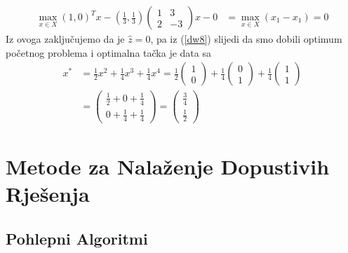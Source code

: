 \documentclass[a4paper, utf8, 11pt, colorlinks]{book}
\begin{document}
	 \begin{align*}
		\max_{x \in X} (1, 0)^T x - (\frac{1}{3}, \frac{1}{3})\left(\begin{array}{cc}
			1 & 3 \\
			2 & -3
		\end{array}\right)  x   - 0 &= \max_{x \in X} (x_1  - x_1 ) = 0    
	\end{align*} 
  Iz ovoga zaključujemo da je $\hat{z}=0$, pa iz (\ref{dw8}) slijedi da smo dobili optimum početnog problema i optimalna tačka je data sa 
\begin{align*}
  	 x^* &= \frac{1}{2} x^2 + \frac{1}{4} x^3 + \frac{1}{4} x^4  
  	     = \frac{1}{2} \begin{pmatrix}
  	     	      1 \\
  	     	      0
  	     \end{pmatrix} +
       \frac{1}{4} \begin{pmatrix}
       	                  0 \\
       	                  1
       \end{pmatrix} +
   \frac{1}{4} \begin{pmatrix}
   	                  1 \\
   	                  1
   \end{pmatrix}\\
   &= \begin{pmatrix}
   	        \frac{1}{2} + 0 + \frac{1}{4} \\
   	        0 + \frac{1}{4} + \frac{1}{4}
   \end{pmatrix} = \begin{pmatrix}
         \frac{3}{4} \\
         \frac{1}{2}
  \end{pmatrix}
\end{align*}



 \chapter{Metode za Nalaženje Dopustivih Rješenja}

\section{Pohlepni Algoritmi}
 
\end{document}
